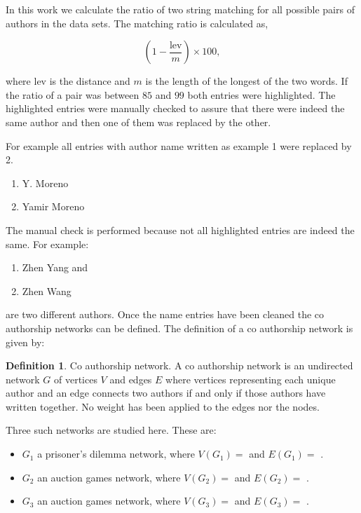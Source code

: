 \documentclass{article}
\theoremstyle{definition}
\newtheorem{definition}{Definition}[section]
\newcommand{\authors}{}
\newcommand{\edges}{}
\newcommand{\auctionauthors}{}
\newcommand{\auctionedges}{}
\newcommand{\priceauthors}{}
\newcommand{\priceedges}{}
\begin{document}
In this work we calculate the ratio of two string matching for all possible
pairs of authors in the data sets. The matching ratio is calculated as,

\[(1 - \frac{\text{lev}}{m}) \times 100,\]

where \(\text{lev}\) is the distance and \(m\) is the length of the longest of
the two words. If the ratio of a pair was between \(85\) and \(99\) both entries
were highlighted. The highlighted entries were manually checked to assure that
there were indeed the same author and then one of them was replaced by the other.

For example all entries with author name written as example 1 were replaced by
2.

\begin{enumerate}
    \item Y. Moreno
    \item Yamir Moreno
\end{enumerate}

The manual check is performed because not all highlighted entries are indeed the
same. For example:

\begin{enumerate}
    \item Zhen Yang and
    \item Zhen Wang
\end{enumerate}

are two different authors. Once the name entries have been cleaned the
co authorship networks can be defined. The definition of a co authorship network
is given by:

\begin{definition}{Co authorship network.}
    A co authorship network is an undirected network \(G\) of vertices \(V\) and
    edges \(E\) where vertices representing each unique author and an edge
    connects two authors if and only if those authors have written together.
    No weight has been applied to the edges nor the nodes.
\end{definition}

Three such networks are studied here. These are:

\begin{itemize}
    \item \(G_1\) a prisoner's dilemma network, where \(V(G_1)=\) \authors and
    \(E(G_1)=\) \edges.
    \item \(G_2\) an auction games network, where \(V(G_2)=\) \auctionauthors and
    \(E(G_2)=\) \auctionedges.
    \item \(G_3\) an auction games network, where \(V(G_3)=\) \priceauthors and
    \(E(G_3)=\) \priceedges.
\end{itemize}
\end{document}
